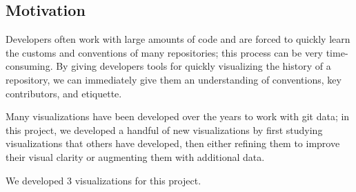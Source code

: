 \documentclass[12 pt]{article}
\begin{document}
\subsection{Motivation}
Developers often work with large amounts of code and are forced to quickly learn
the customs and conventions of many repositories; this process can be very
time-consuming. By giving developers tools for quickly visualizing the history
of a repository, we can immediately give them an understanding of conventions, key
contributors, and etiquette. \par
Many visualizations have been developed over the years to work with git data;
in this project, we developed a handful of new visualizations by first
studying visualizations that others have developed, then either refining them to
improve their visual clarity or augmenting them with additional data. \par
We developed 3 visualizations for this project.
\end{document}
